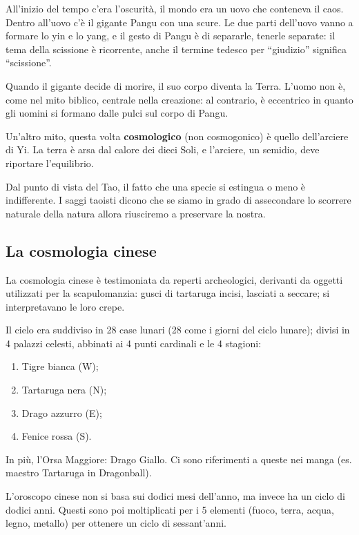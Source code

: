 \documentclass[main.tex]{subfiles}
\begin{document}
All'inizio del tempo c'era l'oscurità, il mondo era un uovo che conteneva il caos. 
Dentro all'uovo c'è il gigante Pangu con una scure. 
Le due parti dell'uovo vanno a formare lo yin e lo yang, e il gesto di Pangu è di separarle, tenerle separate: 
il tema della scissione è ricorrente, anche il termine tedesco per ``giudizio'' significa ``scissione''. 

Quando il gigante decide di morire, il suo corpo diventa la Terra. 
L'uomo non è, come nel mito biblico, centrale nella creazione: al contrario, è eccentrico in quanto gli uomini si formano dalle pulci sul corpo di Pangu. 

Un'altro mito, questa volta \textbf{cosmologico} (non cosmogonico) è quello dell'arciere di Yi. 
La terra è arsa dal calore dei dieci Soli, e l'arciere, un semidio, deve riportare l'equilibrio. 

Dal punto di vista del Tao, il fatto che una specie si estingua o meno è indifferente. 
I saggi taoisti dicono che se siamo in grado di assecondare lo scorrere naturale della natura allora riusciremo a preservare la nostra. 

\subsection{La cosmologia cinese}

La cosmologia cinese è testimoniata da reperti archeologici, derivanti da oggetti utilizzati per la scapulomanzia: gusci di tartaruga incisi, lasciati a seccare; si interpretavano le loro crepe. 

Il cielo era suddiviso in 28 case lunari (28 come i giorni del ciclo lunare); divisi in 4 palazzi celesti, abbinati ai 4 punti cardinali e le 4 stagioni: 
\begin{enumerate}
    \item Tigre bianca (W);
    \item Tartaruga nera (N);
    \item Drago azzurro (E);
    \item Fenice rossa (S).
\end{enumerate}

In più, l'Orsa Maggiore: Drago Giallo. 
Ci sono riferimenti a queste nei manga (es. maestro Tartaruga in Dragonball).

L'oroscopo cinese non si basa sui dodici mesi dell'anno, ma invece ha un ciclo di dodici anni. 
Questi sono poi moltiplicati per i 5 elementi (fuoco, terra, acqua, legno, metallo) per ottenere un ciclo di sessant'anni.
\end{document}
